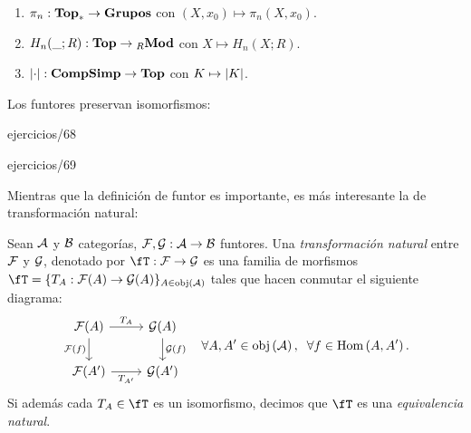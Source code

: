 \documentclass[../../topologia_algebraica]{subfiles}
\begin{document}
 \begin{ejemplo}$\;$\\
   \begin{enumerate}
   \item $\pi_n:\mathbf{Top}_*\rightarrow\mathbf{Grupos}$ con $(X,x_0)\mapsto\pi_n(X,x_0)$.
   \item $H_n(\_;R):\mathbf{Top}\rightarrow{}_R\mathbf{Mod}$ con $X\mapsto H_n(X;R)$.
     \item $\left| \cdot \right|:\mathbf{CompSimp}\rightarrow\mathbf{Top}$ con $K\mapsto\left| K \right|$.
   \end{enumerate}
 \end{ejemplo}

 Los funtores preservan isomorfismos:

 {ejercicios/68} %

 {ejercicios/69} %

 Mientras que la definici\'on de funtor es importante, es m\'as interesante la
 de transformaci\'on natural:

 \begin{defin}
   Sean $\mathcal{A}$ y $\mathcal{B}$ categor\'ias, $\mathcal{F},\mathcal{G}:\mathcal{A}\rightarrow\mathcal{B}$ funtores. Una \emph{transformaci\'on
     natural} entre $\mathcal{F}$ y $\mathcal{G}$, denotado por $\fT:\Ff\ra\Gg$ es una familia de morfismos
   $\fT=\{T_A:\Ff(A)\ra\Gg(A)\}_{A\in\obj{\Aa}}$ tales que hacen conmutar el siguiente diagrama:
   \[
     \begin{tikzcd}
       \Ff(A) \arrow[r,"T_A"] \arrow[d,"\Ff(f)"'] & \Gg(A) \arrow[d,"\Gg(f)"] \\
       \Ff(A') \arrow[r,"T_{A'}"'] & \Gg(A')
     \end{tikzcd}\quad\forall A,A'\in\obj{\Aa},\;\;\forall f\in\Hom{A,A'}.
   \]
   Si adem\'as cada $T_A\in \fT$ es un isomorfismo, decimos que $\fT$ es una \emph{equivalencia
   natural}.
\end{defin}
\end{document}
